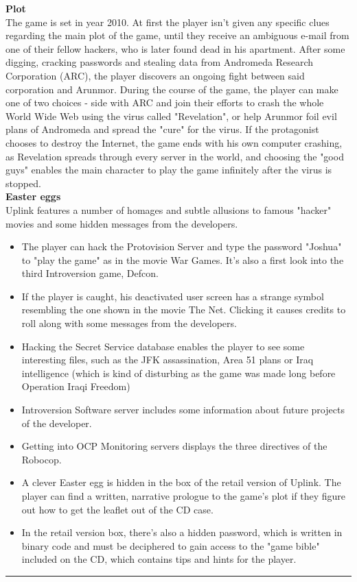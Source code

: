 \documentclass[11pt,twoside,a4paper]{book}
\begin{document}
{\textbf{Plot}~\\
The game is set in year 2010. At first the player isn't given any specific clues regarding the main plot of the game, until they receive an ambiguous e-mail from one of their fellow hackers, who is later found dead in his apartment. After some digging, cracking passwords and stealing data from Andromeda Research Corporation (ARC), the player discovers an ongoing fight between said corporation and Arunmor. During the course of the game, the player can make one of two choices - side with ARC and join their efforts to crash the whole World Wide Web using the virus called "Revelation", or help Arunmor foil evil plans of Andromeda and spread the "cure" for the virus. If the protagonist chooses to destroy the Internet, the game ends with his own computer crashing, as Revelation spreads through every server in the world, and choosing the "good guys" enables the main character to play the game infinitely after the virus is stopped. ~\\

\textbf{Easter eggs}~\\
Uplink features a number of homages and subtle allusions to famous "hacker" movies and some hidden messages from the developers. ~\\
\begin{itemize}
    \item[] The player can hack the Protovision Server and type the password "Joshua" to "play the game" as in the movie War Games. It's also a first look into the third Introversion game, Defcon.
    \item[] If the player is caught, his deactivated user screen has a strange symbol resembling the one shown in the movie The Net. Clicking it causes credits to roll along with some messages from the developers.
    \item[] Hacking the Secret Service database enables the player to see some interesting files, such as the JFK assassination, Area 51 plans or Iraq intelligence (which is kind of disturbing as the game was made long before Operation Iraqi Freedom)
    \item[] Introversion Software server includes some information about future projects of the developer.
    \item[] Getting into OCP Monitoring servers displays the three directives of the Robocop.
    \item[] A clever Easter egg is hidden in the box of the retail version of Uplink. The player can find a written, narrative prologue to the game's plot if they figure out how to get the leaflet out of the CD case.
    \item[] In the retail version box, there's also a hidden password, which is written in binary code and must be deciphered to gain access to the "game bible" included on the CD, which contains tips and hints for the player.
\end{itemize}

\begin{center} \rule{0.85\textwidth}{0.01cm} \end{center}

} %
\end{document}
